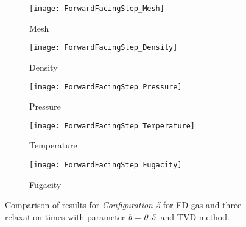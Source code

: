 \documentclass[twoside,twocolumn,prc,floats,amsmath,amssymb]{revtex4} %
\begin{document}
\begin{figure}
        \centering
        \begin{subfigure}[b]{0.45\textwidth}
                \centering
                \texttt{[image: ForwardFacingStep\_Mesh]}
                \caption{Mesh}
                \label{FFS_mesh}
        \end{subfigure}%
				
        \begin{subfigure}[b]{0.45\textwidth}
                \centering
                \texttt{[image: ForwardFacingStep\_Density]}
                \caption{Density}
                \label{fig:FFS_Density}
        \end{subfigure}
				
        \begin{subfigure}[b]{0.45\textwidth}
								\centering
                \texttt{[image: ForwardFacingStep\_Pressure]}
                \caption{Pressure}
                \label{fig:FFS_Pressure}
        \end{subfigure}
				
        \begin{subfigure}[b]{0.45\textwidth}
								\centering
                \texttt{[image: ForwardFacingStep\_Temperature]}
                \caption{Temperature}
                \label{fig:FFS_temperaute}
        \end{subfigure}
				
				\begin{subfigure}[b]{0.45\textwidth}
								\centering
                \texttt{[image: ForwardFacingStep\_Fugacity]}
                \caption{Fugacity}
                \label{fig:FFS_Fugacity}
        \end{subfigure}
				\caption{Comparison of results for \emph{Configuration 5} for FD gas and three relaxation times with parameter $\it{b=0.5}$ and TVD method.}
				\label{fig:FD_config5_tau_comparison2}
\end{figure}
\end{document}
